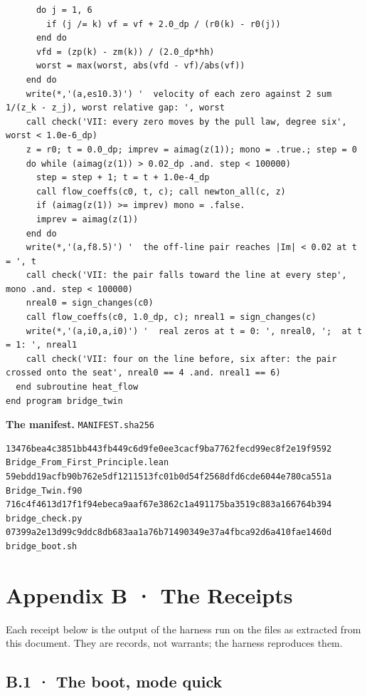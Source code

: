 \documentclass[10pt,twocolumn]{article}
\begin{document}
\begin{Verbatim}
      do j = 1, 6
        if (j /= k) vf = vf + 2.0_dp / (r0(k) - r0(j))
      end do
      vfd = (zp(k) - zm(k)) / (2.0_dp*hh)
      worst = max(worst, abs(vfd - vf)/abs(vf))
    end do
    write(*,'(a,es10.3)') '  velocity of each zero against 2 sum 1/(z_k - z_j), worst relative gap: ', worst
    call check('VII: every zero moves by the pull law, degree six', worst < 1.0e-6_dp)
    z = r0; t = 0.0_dp; imprev = aimag(z(1)); mono = .true.; step = 0
    do while (aimag(z(1)) > 0.02_dp .and. step < 100000)
      step = step + 1; t = t + 1.0e-4_dp
      call flow_coeffs(c0, t, c); call newton_all(c, z)
      if (aimag(z(1)) >= imprev) mono = .false.
      imprev = aimag(z(1))
    end do
    write(*,'(a,f8.5)') '  the off-line pair reaches |Im| < 0.02 at t = ', t
    call check('VII: the pair falls toward the line at every step', mono .and. step < 100000)
    nreal0 = sign_changes(c0)
    call flow_coeffs(c0, 1.0_dp, c); nreal1 = sign_changes(c)
    write(*,'(a,i0,a,i0)') '  real zeros at t = 0: ', nreal0, ';  at t = 1: ', nreal1
    call check('VII: four on the line before, six after: the pair crossed onto the seat', nreal0 == 4 .and. nreal1 == 6)
  end subroutine heat_flow
end program bridge_twin
\end{Verbatim}

\textbf{The manifest.} \texttt{MANIFEST.sha256}

\begin{Verbatim}
13476bea4c3851bb443fb449c6d9fe0ee3cacf9ba7762fecd99ec8f2e19f9592  Bridge_From_First_Principle.lean
59ebdd19acfb90b762e5df1211513fc01b0d54f2568dfd6cde6044e780ca551a  Bridge_Twin.f90
716c4f4613d17f1f94ebeca9aaf67e3862c1a491175ba3519c883a166764b394  bridge_check.py
07399a2e13d99c9ddc8db683aa1a76b71490349e37a4fbca92d6a410fae1460d  bridge_boot.sh
\end{Verbatim}

\hypertarget{appendix-b-the-receipts}{%
\section{Appendix B · The Receipts}\label{appendix-b-the-receipts}}

Each receipt below is the output of the harness run on the files as
extracted from this document. They are records, not warrants; the
harness reproduces them.

\hypertarget{b.1-the-boot-mode-quick}{%
\subsection{B.1 · The boot, mode quick}\label{b.1-the-boot-mode-quick}}
\end{document}
